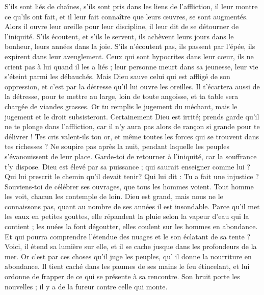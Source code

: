 \begin{multicols}{2}
S'ils sont liés de chaînes, s'ils sont pris dans les liens de l'affliction,
il leur montre ce qu'ils ont fait, et il leur fait connaître que leurs œuvres, se sont augmentés.
Alors il ouvre leur oreille pour leur discipline, il leur dit de se détourner de l'iniquité.
S'ils écoutent, et s'ils le servent, ils achèvent leurs jours dans le bonheur, leurs années dans la joie.
S'ils n'écoutent pas, ils passent par l'épée, ils expirent dans leur aveuglement.
Ceux qui sont hypocrites dans leur cœur, ils ne crient pas à lui quand il les a liés ;
leur personne meurt dans sa jeunesse, leur vie s'éteint parmi les débauchés.
Mais Dieu sauve celui qui est affligé de son oppression, et c'est par la détresse qu'il lui ouvre les oreilles.
Il t'écartera aussi de la détresse, pour te mettre au large, loin de toute angoisse, et ta table sera chargée de viandes grasses.
Or tu remplis le jugement du méchant, mais le jugement et le droit subsisteront.
Certainement Dieu est irrité; prends garde qu'il ne te  plonge dans l'affliction, car il n'y aura pas alors de rançon si grande pour te délivrer !
Tes cris valent-ils ton or, et même toutes les forces qui se trouvent dans tes richesses ?
Ne soupire pas après la nuit, pendant laquelle les peuples s'évanouissent de leur place.
Garde-toi de retourner à l'iniquité, car la souffrance t'y dispose.
Dieu est élevé par sa puissance ; qui saurait enseigner comme lui ?
Qui lui prescrit le chemin qu'il devait tenir? Qui lui dit : Tu a fait une injustice ?
Souviens-toi de célébrer ses ouvrages, que tous les hommes voient.
Tout homme les voit, chacun les contemple de loin.
Dieu est grand, mais nous ne le connaissons pas, quant au nombre de ses années il est insondable.
Parce qu'il met les eaux  en petites gouttes, elle répandent la pluie selon la vapeur d'eau qui la contient ;
les nuées la font dégoutter, elles coulent sur les hommes en abondance.
Et qui pourra comprendre l'étendue des nuages et le son éclatant de sa tente ?
Voici, il étend sa lumière sur elle, et il se cache jusque dans les profondeurs de la mer.
 Or c'est par ces choses qu'il juge les peuples, qu' il donne la nourriture en abondance.
 Il tient caché dans les paumes de ses mains le feu étincelant, et lui ordonne de frapper de ce qui se présente à sa rencontre.
 Son bruit porte les nouvelles ; il y a de la fureur contre celle qui monte.

\end{multicols}
